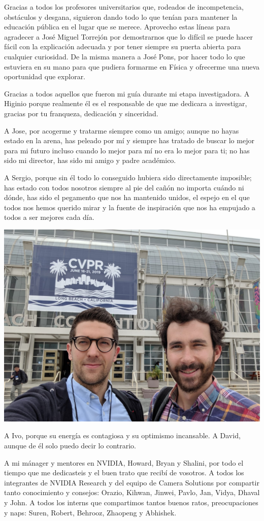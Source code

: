 Gracias a todos los profesores universitarios que, rodeados de incompetencia, obstáculos y desgana, siguieron dando todo lo que tenían para mantener la educación pública en el lugar que se merece. Aprovecho estas líneas para agradecer a José Miguel Torrejón por demostrarnos que lo difícil se puede hacer fácil con la explicación adecuada y por tener siempre su puerta abierta para cualquier curiosidad. De la misma manera a José Pons, por hacer todo lo que estuviera en su mano para que pudiera formarme en Física y ofrecerme una nueva oportunidad que explorar.

Gracias a todos aquellos que fueron mi guía durante mi etapa investigadora. A Higinio porque realmente él es el responsable de que me dedicara a investigar, gracias por tu franqueza, dedicación y sinceridad.

A Jose, por acogerme y tratarme siempre como un amigo; aunque no hayas estado en la arena, has peleado por mí y siempre has tratado de buscar lo mejor para mi futuro incluso cuando lo mejor para mí no era lo mejor para ti; no has sido mi director, has sido mi amigo y padre académico.

A Sergio, porque sin él todo lo conseguido hubiera sido directamente imposible; has estado con todos nosotros siempre al pie del cañón no importa cuándo ni dónde, has sido el pegamento que nos ha mantenido unidos, el espejo en el que todos nos hemos querido mirar y la fuente de inspiración que nos ha empujado a todos a ser mejores cada día.

\begin{center}
	\includegraphics[width=0.6\linewidth]{Figures/Ack/sergio}
\end{center}

A Ivo, porque su energía es contagiosa y su optimismo incansable. A David, aunque de él solo puedo decir lo contrario.

A mi mánager y mentores en NVIDIA, Howard, Bryan y Shalini, por todo el tiempo que me dedicasteis y el buen trato que recibí de vosotros. A todos los integrantes de NVIDIA Research y del equipo de Camera Solutions por compartir tanto conocimiento y consejos: Orazio, Kihwan, Jinwei, Pavlo, Jan, Vidya, Dhaval y John. A todos los interns que compartimos tantos buenos ratos, preocupaciones y naps: Suren, Robert, Behrooz, Zhaopeng y Abhishek.

